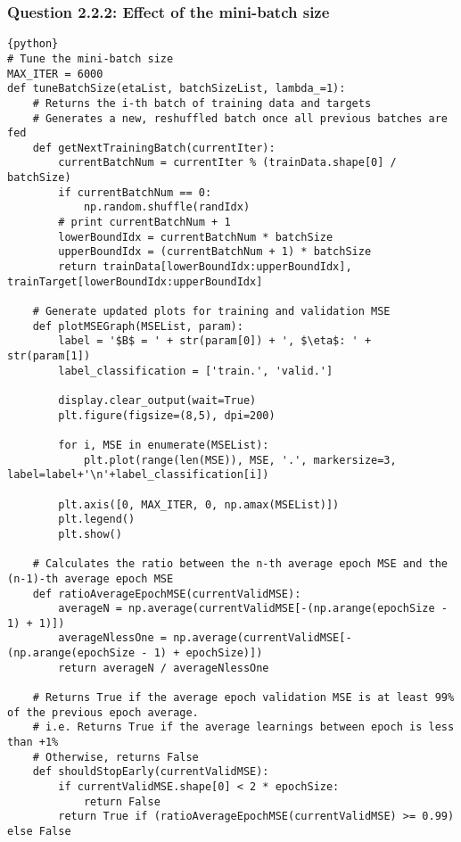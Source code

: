 \documentclass[a4paper,12pt]{article}
\begin{document}
\subsubsection{Question 2.2.2: Effect of the mini-batch size}
\begin{verbatim}
{python}
# Tune the mini-batch size
MAX_ITER = 6000
def tuneBatchSize(etaList, batchSizeList, lambda_=1):
    # Returns the i-th batch of training data and targets
    # Generates a new, reshuffled batch once all previous batches are fed
    def getNextTrainingBatch(currentIter):
        currentBatchNum = currentIter % (trainData.shape[0] / batchSize)
        if currentBatchNum == 0:
            np.random.shuffle(randIdx)
        # print currentBatchNum + 1
        lowerBoundIdx = currentBatchNum * batchSize
        upperBoundIdx = (currentBatchNum + 1) * batchSize 
        return trainData[lowerBoundIdx:upperBoundIdx], trainTarget[lowerBoundIdx:upperBoundIdx]
    
    # Generate updated plots for training and validation MSE
    def plotMSEGraph(MSEList, param):
        label = '$B$ = ' + str(param[0]) + ', $\eta$: ' + str(param[1])
        label_classification = ['train.', 'valid.']

        display.clear_output(wait=True)
        plt.figure(figsize=(8,5), dpi=200)
        
        for i, MSE in enumerate(MSEList):
            plt.plot(range(len(MSE)), MSE, '.', markersize=3, label=label+'\n'+label_classification[i])
        
        plt.axis([0, MAX_ITER, 0, np.amax(MSEList)])
        plt.legend()
        plt.show()
    
    # Calculates the ratio between the n-th average epoch MSE and the (n-1)-th average epoch MSE
    def ratioAverageEpochMSE(currentValidMSE):
        averageN = np.average(currentValidMSE[-(np.arange(epochSize - 1) + 1)])
        averageNlessOne = np.average(currentValidMSE[-(np.arange(epochSize - 1) + epochSize)])
        return averageN / averageNlessOne
    
    # Returns True if the average epoch validation MSE is at least 99% of the previous epoch average.
    # i.e. Returns True if the average learnings between epoch is less than +1%
    # Otherwise, returns False
    def shouldStopEarly(currentValidMSE):
        if currentValidMSE.shape[0] < 2 * epochSize:
            return False
        return True if (ratioAverageEpochMSE(currentValidMSE) >= 0.99) else False
    

\end{verbatim}
\end{document}
